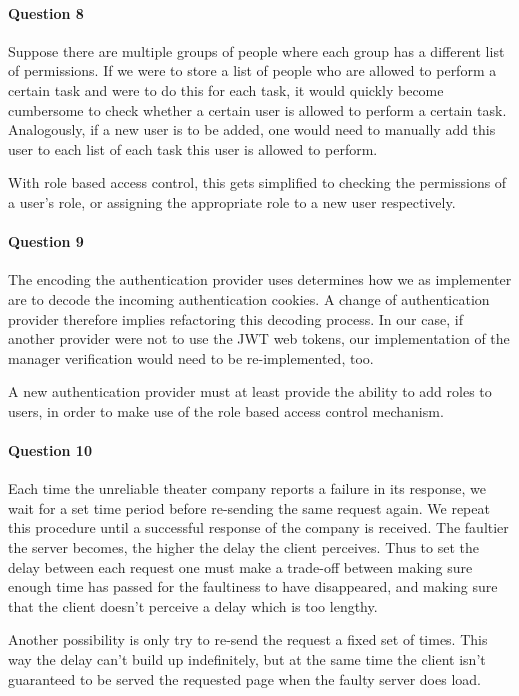 \documentclass{ds-report}
\begin{document}
	\paragraph{Question 8} 
	Suppose there are multiple groups of people where each group has a different list of permissions. If we were to store a list of people who are allowed to perform a certain task and were to do this for each task, it would quickly become cumbersome to check whether a certain user is allowed to perform a certain task. Analogously, if a new user is to be added, one would need to manually add this user to each list of each task this user is allowed to perform.
	
	With role based access control, this gets simplified to checking the permissions of a user's role, or assigning the appropriate role to a new user respectively.
	
	\paragraph{Question 9}
	The encoding the authentication provider uses determines how we as implementer are to decode the incoming authentication cookies. A change of authentication provider therefore implies refactoring this decoding process. In our case, if another provider were not to use the JWT web tokens, our implementation of the manager verification would need to be re-implemented, too.
	
	A new authentication provider must at least provide the ability to add roles to users, in order to make use of the role based access control mechanism. 
	
	\paragraph{Question 10}
	Each time the unreliable theater company reports a failure in its response, we wait for a set time period before re-sending the same request again. We repeat this procedure until a successful response of the company is received. The faultier the server becomes, the higher the delay the client perceives. Thus to set the delay between each request 
	one must make a trade-off between making sure enough time has passed for the faultiness to have disappeared, and making sure that the client doesn't perceive a delay which is too lengthy. 
	
	Another possibility is only try to re-send the request a fixed set of times. This way the delay can't build up indefinitely, but at the same time the client isn't guaranteed to be served the requested page when the faulty server does load. 
	\clearpage
	
	
\end{document}
